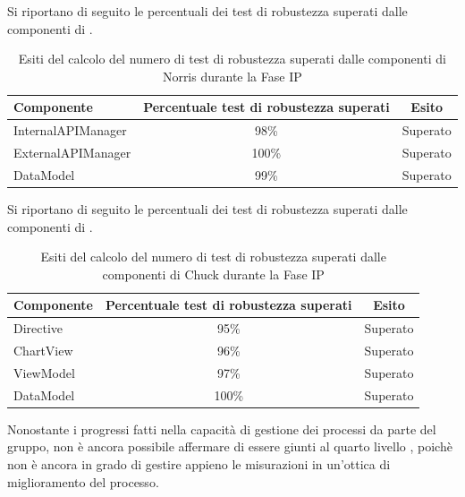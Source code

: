 	Si riportano di seguito le percentuali dei test di robustezza superati dalle componenti di .
	\begin{table}[H]
		\centering
			\begin{tabu}{| l | c | c |}
				\hline
				Componente	& Percentuale test di robustezza superati	& Esito		\\ \hline \hline
				InternalAPIManager	& 98\% 	& Superato  \\ \hline
				ExternalAPIManager  & 100\%		& Superato  \\ \hline
				DataModel  & 99\%		& Superato  \\ \hline
			\end{tabu}
		\caption{Esiti del calcolo del numero di test di robustezza superati dalle componenti di Norris durante la Fase IP}
	\end{table}

	Si riportano di seguito le percentuali dei test di robustezza superati dalle componenti di .
	\begin{table}[H]
		\centering
			\begin{tabu}{| l | c | c |}
				\hline
				Componente	& Percentuale test di robustezza superati	& Esito		\\ \hline \hline
				Directive	& 95\% 	& Superato  \\ \hline
				ChartView  & 96\%		& Superato  \\ \hline
				ViewModel  & 97\%		& Superato  \\ \hline
				DataModel  & 100\%		& Superato  \\ \hline
			\end{tabu}
		\caption{Esiti del calcolo del numero di test di robustezza superati dalle componenti di Chuck durante la Fase IP}
	\end{table}


	Nonostante i progressi fatti nella capacità di gestione dei processi da parte del gruppo, non è ancora possibile affermare di essere giunti al quarto livello , poichè non è ancora in grado di gestire appieno le misurazioni in un'ottica di miglioramento del processo.


